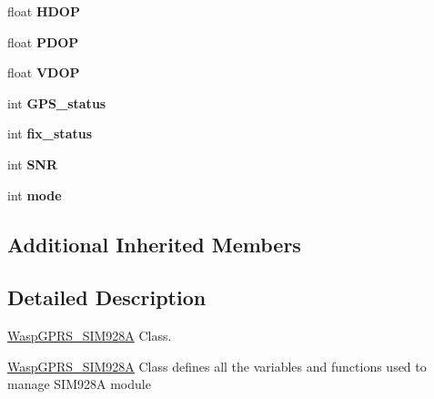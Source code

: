 \begin{DoxyCompactItemize}
\item 
float {\bfseries H\+D\+OP}\hypertarget{class_wasp_g_p_r_s___s_i_m928_a_a0029934ebd5e0564f81589a8053eb9bf}{}\label{class_wasp_g_p_r_s___s_i_m928_a_a0029934ebd5e0564f81589a8053eb9bf}

\item 
float {\bfseries P\+D\+OP}\hypertarget{class_wasp_g_p_r_s___s_i_m928_a_a9ecaeccc36d95273e14c0a2719907dda}{}\label{class_wasp_g_p_r_s___s_i_m928_a_a9ecaeccc36d95273e14c0a2719907dda}

\item 
float {\bfseries V\+D\+OP}\hypertarget{class_wasp_g_p_r_s___s_i_m928_a_a713f93dbec374b59792f67e30d5648e7}{}\label{class_wasp_g_p_r_s___s_i_m928_a_a713f93dbec374b59792f67e30d5648e7}

\item 
int {\bfseries G\+P\+S\+\_\+status}\hypertarget{class_wasp_g_p_r_s___s_i_m928_a_afb6da1e8ad6284dc54e2118759490c0b}{}\label{class_wasp_g_p_r_s___s_i_m928_a_afb6da1e8ad6284dc54e2118759490c0b}

\item 
int {\bfseries fix\+\_\+status}\hypertarget{class_wasp_g_p_r_s___s_i_m928_a_a411ea458aeac82aa5af76555bfe94451}{}\label{class_wasp_g_p_r_s___s_i_m928_a_a411ea458aeac82aa5af76555bfe94451}

\item 
int {\bfseries S\+NR}\hypertarget{class_wasp_g_p_r_s___s_i_m928_a_ad23f8691cc2fb6b27d139858291f2386}{}\label{class_wasp_g_p_r_s___s_i_m928_a_ad23f8691cc2fb6b27d139858291f2386}

\item 
int {\bfseries mode}\hypertarget{class_wasp_g_p_r_s___s_i_m928_a_ad51d1288371046657c584fe41c815be9}{}\label{class_wasp_g_p_r_s___s_i_m928_a_ad51d1288371046657c584fe41c815be9}

\end{DoxyCompactItemize}
\subsection*{Additional Inherited Members}


\subsection{Detailed Description}
\hyperlink{class_wasp_g_p_r_s___s_i_m928_a}{Wasp\+G\+P\+R\+S\+\_\+\+S\+I\+M928A} Class. 

\hyperlink{class_wasp_g_p_r_s___s_i_m928_a}{Wasp\+G\+P\+R\+S\+\_\+\+S\+I\+M928A} Class defines all the variables and functions used to manage S\+I\+M928A module 

